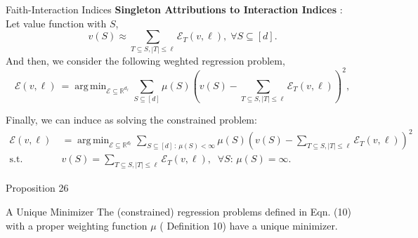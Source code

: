 \documentclass[10pt]{beamer}
\newcommand{\f}{v}
\newcommand{\ex}{\Expl}
\def\Expl{\mathcal{E}}
\DeclareMathOperator*{\argmin}{arg\,min}
\begin{document}
\begin{frame}{Faith-Interaction Indices}
    \textbf{Singleton Attributions to Interaction Indices} : \\
    Let value function with $S$, \[\f(S) \approx \sum_{T \subseteq S, |T| \leq \ell} \Expl_T(\f,\ell),\; \forall S \subseteq [d].\]
    And then, we consider the following weghted regression problem,
    \begin{equation*}
    \label{eqn:weighted_regression}
    \ex(\f, \ell) \ = \argmin_{\Expl \subseteq \mathbb{R}^{d_\ell} } 
    \sum_{S \subseteq [d]}  \mu(S) \left( \f(S) - \sum_{T \subseteq S , |T| \leq \ell}\Expl_T(\f,\ell) \right)^2,
    \tag{9}
    \end{equation*}
\end{frame}
\begin{frame}
    Finally, we can induce as solving the constrained problem:
    \begin{align*}
    \ex(\f, \ell) \ 
    &= \argmin_{\Expl \subseteq \mathbb{R}^{d_\ell} } \sum_{S \subseteq [d]\,:\, \mu(S) < \infty}  \mu(S) \left( \f(S) - \sum_{T \subseteq S , |T| \leq \ell}\Expl_T(\f,\ell) \right)^2 \nonumber \\
    \text{s.t.} \ & \f(S) = \sum_{T \subseteq S , |T| \leq \ell}\Expl_T(\f,\ell), \;\;\forall S :\, \mu(S) = \infty.
    \label{eqn:constrained_weighted_regresion}
    \tag{10}
    \end{align*}
\end{frame}
\begin{frame}{Proposition 26}
    \begin{myaxiombox}{A Unique Minimizer}
        The (constrained) regression problems defined in  Eqn. (10) with a proper weighting function $\mu$ ( Definition 10)
        have a unique minimizer.
    \end{myaxiombox}

\end{frame}
\end{document}
